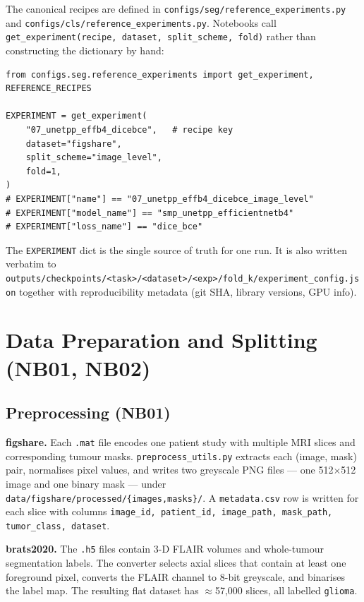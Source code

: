 \documentclass[12pt,a4paper]{article}
\begin{document}
The canonical recipes are defined in
\texttt{configs/seg/reference\_experiments.py} and
\texttt{configs/cls/reference\_experiments.py}.
Notebooks call \texttt{get\_experiment(recipe, dataset, split\_scheme, fold)}
rather than constructing the dictionary by hand:

\begin{lstlisting}[caption={Composing an EXPERIMENT dict via the recipe API.}]
from configs.seg.reference_experiments import get_experiment, REFERENCE_RECIPES

EXPERIMENT = get_experiment(
    "07_unetpp_effb4_dicebce",   # recipe key
    dataset="figshare",
    split_scheme="image_level",
    fold=1,
)
# EXPERIMENT["name"] == "07_unetpp_effb4_dicebce_image_level"
# EXPERIMENT["model_name"] == "smp_unetpp_efficientnetb4"
# EXPERIMENT["loss_name"] == "dice_bce"
\end{lstlisting}

The \texttt{EXPERIMENT} dict is the single source of truth for one run.  It is
also written verbatim to
\texttt{outputs/checkpoints/<task>/<dataset>/<exp>/fold\_k/experiment\_config.json}
together with reproducibility metadata (git SHA, library versions, GPU info).

\section{Data Preparation and Splitting (NB01, NB02)}

\subsection{Preprocessing (NB01)}

\textbf{figshare.}  Each \texttt{.mat} file encodes one patient study with
multiple MRI slices and corresponding tumour masks.  \texttt{preprocess\_utils.py}
extracts each (image, mask) pair, normalises pixel values, and writes two
greyscale PNG files --- one 512$\times$512 image and one binary mask --- under
\texttt{data/figshare/processed/\{images,masks\}/}.  A \texttt{metadata.csv}
row is written for each slice with columns
\texttt{image\_id, patient\_id, image\_path, mask\_path, tumor\_class, dataset}.

\textbf{brats2020.}  The \texttt{.h5} files contain 3-D FLAIR volumes and
whole-tumour segmentation labels.  The converter selects axial slices that
contain at least one foreground pixel, converts the FLAIR channel to 8-bit
greyscale, and binarises the label map.  The resulting flat dataset has
$\approx$57{,}000 slices, all labelled \texttt{glioma}.
\end{document}
